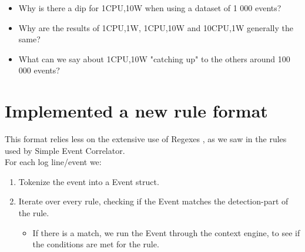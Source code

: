 \begin{itemize}
\item Why is there a dip for 1CPU,10W when using a dataset of 1 000 events?
\item Why are the results of 1CPU,1W, 1CPU,10W and 10CPU,1W generally the same?
\item What can we say about 1CPU,10W "catching up" to the others around 100 000 events?
\end{itemize}


\section{Implemented a new rule format}
This format relies less on the extensive use of Regexes , as we saw in the rules used by Simple Event Correlator. 
\\
For each log line/event we:

\begin{enumerate}
    \item Tokenize the event into a Event struct. 
    \item Iterate over every rule, checking if the Event matches the detection-part of the rule.
    \begin{itemize}
        \item If there is a match, we run the Event through the context engine, to see if the conditions are met for the rule.
    \end{itemize}
\end{enumerate}

